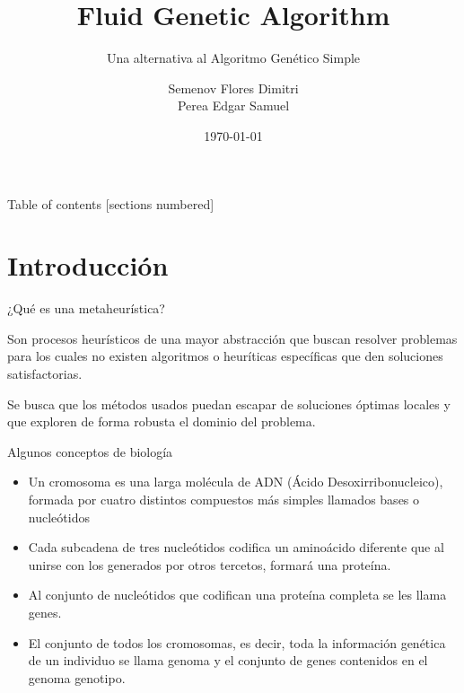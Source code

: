 \documentclass[10pt]{beamer}
\title{Fluid Genetic Algorithm}
\subtitle{Una alternativa al Algoritmo Genético Simple}
\date{\today}
\author{Semenov Flores Dimitri \\
		Perea Edgar Samuel}
\institute{Universidad Nacional Autonoma de México}
\begin{document}
\maketitle

\begin{frame}{Table of contents}
  [sections numbered]
  \tableofcontents[hideallsubsections]
\end{frame}

\section{Introducción}

\begin{frame}{¿Qué es una metaheurística?}

	Son procesos heurísticos de una mayor abstracción que buscan resolver problemas
	para los cuales no existen algoritmos o heuríticas específicas que den \alert{soluciones
	satisfactorias}.
	
	Se busca que los métodos usados puedan \alert{escapar} de soluciones óptimas locales y que
	\alert{exploren} de forma robusta el dominio del problema.

\end{frame}

\begin{frame}{Algunos conceptos de biología}

	\begin{itemize}
		
		\item Un \alert{cromosoma} es una larga molécula de ADN (Ácido Desoxirribonucleico),
		 formada por cuatro distintos compuestos más simples llamados bases o nucleótidos
		 
		 \item Cada subcadena de tres nucleótidos codifica un aminoácido diferente que al
		unirse con los generados por otros tercetos, formará una proteína.
		
		\item Al conjunto de nucleótidos que codifican una proteína completa se
		 les llama \alert{genes}.
		 
		 \item El conjunto de todos los cromosomas, es decir, toda la información
		  genética de un individuo se llama genoma y el conjunto de
		  genes contenidos en el genoma \alert{genotipo}.
	
	\end{itemize}

\end{frame}
\end{document}
